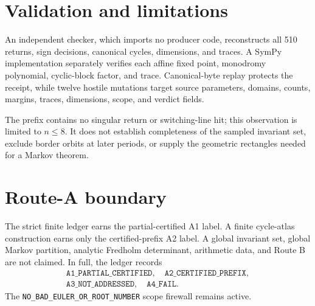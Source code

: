 \documentclass[10pt]{article}
\begin{document}
\section{Validation and limitations}
An independent checker, which imports no producer code, reconstructs all 510
returns, sign decisions, canonical cycles, dimensions, and traces.  A SymPy
implementation separately verifies each affine fixed point, monodromy
polynomial, cyclic-block factor, and trace.  Canonical-byte replay protects
the receipt, while twelve hostile mutations target source parameters,
domains, counts, margins, traces, dimensions, scope, and verdict fields.

The prefix contains no singular return or switching-line hit; this observation
is limited to $n\leq8$.  It does not establish completeness of the sampled
invariant set, exclude border orbits at later periods, or supply the geometric
rectangles needed for a Markov theorem.

\section{Route-A boundary}
The strict finite ledger earns the partial-certified A1 label.  A finite
cycle-atlas construction earns only the certified-prefix A2 label.  A global invariant set, global Markov
partition, analytic Fredholm determinant, arithmetic data, and Route B are
not claimed.  In full, the ledger records
\[
\begin{gathered}
\texttt{A1\_PARTIAL\_CERTIFIED},\quad
\texttt{A2\_CERTIFIED\_PREFIX},\\
\texttt{A3\_NOT\_ADDRESSED},\quad \texttt{A4\_FAIL}.
\end{gathered}
\]
The \texttt{NO\_BAD\_EULER\_OR\_ROOT\_NUMBER} scope firewall remains active.
\end{document}
